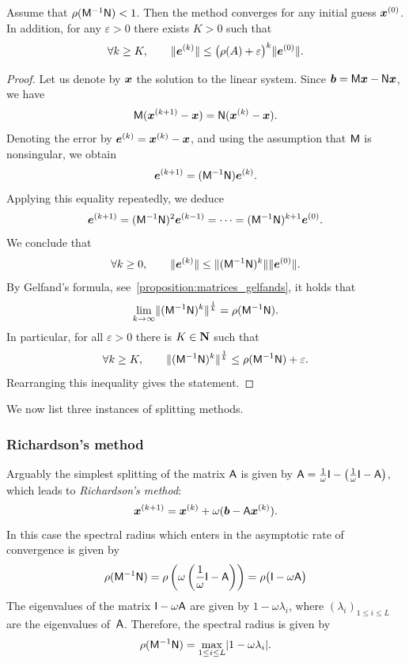 \begin{proposition}
    [Convergence]
    \label{proposition:linear_convergence}
    Assume that $\rho(\mathsf M^{-1} \mathsf N) < 1$.
    Then the method converges for any initial guess $\mathbf{\boldsymbol{x}}^{(0)}$.
    In addition, for any $\varepsilon > 0$ there exists $K > 0$ such that
    \[
        \forall k \geq K,
        \qquad
        \lVert\mathbf{\boldsymbol{e}}^{(k)}\rVert \leq \bigl(\rho(A) + \varepsilon\bigr)^k \lVert\mathbf{\boldsymbol{e}}^{(0)}\rVert.
    \]
\end{proposition}
\begin{proof}
    Let us denote by $\mathbf{\boldsymbol{x}}$ the solution to the linear system.
    Since $\mathbf{\boldsymbol{b}} = \mathsf M \mathbf{\boldsymbol{x}} - \mathsf N \mathbf{\boldsymbol{x}}$,
    we have
    \[
        \mathsf M (\mathbf{\boldsymbol{x}}^{(k+1)} - \mathbf{\boldsymbol{x}}) = \mathsf N (\mathbf{\boldsymbol{x}}^{(k)} - \mathbf{\boldsymbol{x}}).
    \]
    Denoting the error by $\mathbf{\boldsymbol{e}}^{(k)} = \mathbf{\boldsymbol{x}}^{(k)} - \mathbf{\boldsymbol{x}}$,
    and using the assumption that $\mathsf M$ is nonsingular,
    we obtain
    \[
        \mathbf{\boldsymbol{e}}^{(k+1)} = (\mathsf M^{-1} \mathsf N) \mathbf{\boldsymbol{e}}^{(k)}.
    \]
    Applying this equality repeatedly, we deduce
    \[
        \mathbf{\boldsymbol{e}}^{(k+1)} = (\mathsf M^{-1} \mathsf N)^2 \mathbf{\boldsymbol{e}}^{(k-1)} = \dots = (\mathsf M^{-1} \mathsf N)^{k+1} \mathbf{\boldsymbol{e}}^{(0)}.
    \]
    We conclude that
    \[
        \forall k \geq 0, \qquad
        \norm{\vect e^{(k)}}
        \leq \norm[bigl]{(\mat M^{-1} \mat N)^{k}} \norm{\vect e^{(0)}}.
    \]
    By Gelfand's formula, see~\cref{proposition:matrices_gelfands},
    it holds that
    \[
        \lim_{k \to \infty} \norm[bigl]{(\mat M^{-1} \mat N)^{k}}^{\frac{1}{k}} = \rho(\mat M^{-1} \mat N).
    \]
    In particular, for all $\varepsilon > 0$ there is $K \in \mathbf N$ such that
    \[
        \forall k \geq K, \qquad
        \norm[bigl]{(\mat M^{-1} \mat N)^{k}}^{\frac{1}{k}} \leq \rho(\mat M^{-1} \mat N) + \varepsilon.
    \]
    Rearranging this inequality gives the statement.
\end{proof}

We now list three instances of splitting methods.
\subsubsection{Richardson's method}%
\label{ssub:richardson_s_method}

Arguably the simplest splitting of the matrix $\mathsf A$ is given by $\mathsf A = \frac{1}{\omega} \mathsf I - \bigl(\frac{1}{\omega} \mathsf I - \mathsf A\bigr)$,
which leads to \emph{Richardson's method}:
\begin{equation}
    \label{eq:linear_richardson}
    \mathbf{\boldsymbol{x}}^{(k+1)} = \mathbf{\boldsymbol{x}}^{(k)} +  \omega (\mathbf{\boldsymbol{b}} - \mathsf A \mathbf{\boldsymbol{x}}^{(k)}).
\end{equation}
In this case the spectral radius which enters in the asymptotic rate of convergence is given by
\[
    \rho(\mathsf M^{-1} \mathsf N)
    = \rho\left(\omega \left(\frac{1}{\omega} \mathsf I - \mathsf A\right) \right)
    = \rho\bigl( \mathsf I - \omega \mathsf A \bigr)
\]
The eigenvalues of the matrix $\mathsf I - \omega \mathsf A$ are given by $1 - \omega \lambda_i$,
where $(\lambda_i)_{1 \leq i \leq L}$ are the eigenvalues of~$\mathsf A$.
Therefore, the spectral radius is given by
\[
    \rho(\mathsf M^{-1} \mathsf N)
    = \max_{1 \leq i \leq L} \lvert1  - \omega \lambda_i\rvert.
\]

